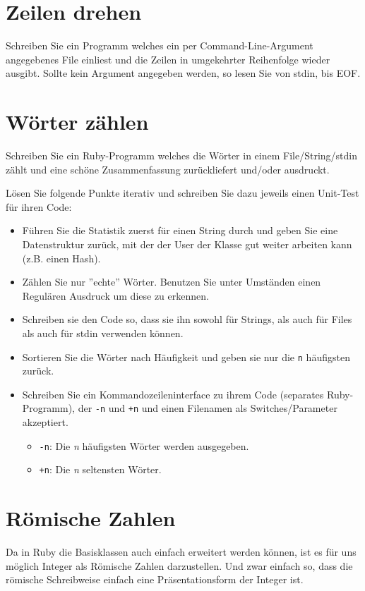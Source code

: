 \documentclass[a4paper,11pt,oneside]{scrbook}
\begin{document}
\section{Zeilen drehen} %
\label{sec:Zeilen drehen}
Schreiben Sie ein Programm welches ein per Command-Line-Argument angegebenes File einliest und die Zeilen in umgekehrter Reihenfolge wieder ausgibt.
Sollte kein Argument angegeben werden, so lesen Sie von stdin, bis EOF.


\section{Wörter zählen} %
\label{sec:Wörter zählen}
Schreiben Sie ein Ruby-Programm welches die Wörter in einem File/String/stdin zählt und eine schöne Zusammenfassung zurückliefert und/oder ausdruckt.

Lösen Sie folgende Punkte iterativ und schreiben Sie dazu jeweils einen Unit-Test für ihren Code:

\begin{itemize}
  \item Führen Sie die Statistik zuerst für einen String durch und geben Sie eine Datenstruktur zurück, mit der der User der Klasse gut weiter arbeiten kann (z.B. einen Hash).
  \item Zählen Sie nur ''echte'' Wörter. Benutzen Sie unter Umständen einen Regulären Ausdruck um diese zu erkennen.
  \item Schreiben sie den Code so, dass sie ihn sowohl für Strings, als auch für Files als auch für stdin verwenden können.
  \item Sortieren Sie die Wörter nach Häufigkeit und geben sie nur die \texttt{n} häufigsten zurück.
  \item Schreiben Sie ein Kommandozeileninterface zu ihrem Code (separates Ruby-Programm), der \texttt{-n} und \texttt{+n} und einen Filenamen als Switches/Parameter akzeptiert.
  \begin{itemize}
    \item \texttt{-n}: Die \emph{n} häufigsten Wörter werden ausgegeben.
    \item \texttt{+n}: Die \emph{n} seltensten Wörter.
  \end{itemize}
  
\end{itemize}




\section{Römische Zahlen} %
\label{sec:römische_zahlen}
Da in Ruby die Basisklassen auch einfach erweitert werden können, ist es für uns möglich Integer als Römische Zahlen darzustellen. Und zwar einfach so, dass die römische Schreibweise einfach eine Präsentationsform der Integer ist.
\end{document}
